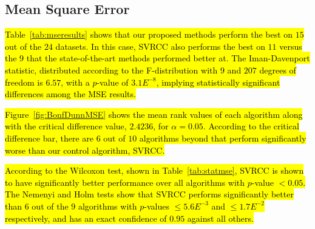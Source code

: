 \documentclass[preprint,12pt]{elsarticle}
\begin{document}
\subsection{Mean Square Error}\label{subsec:mse}
\hl{Table~{\ref{tab:mseresults}} shows that our proposed methods perform the best on $15$ out of the $24$ datasets. In this case, SVRCC also performs the best on $11$ versus the $9$ that the state-of-the-art methods performed better at. The Iman-Davenport statistic, distributed according to the F-distribution with $9$ and $207$ degrees of freedom is $6.57$, with a $p$-value of $3.1E^{-8}$, implying statistically significant differences among the MSE results.}

\hl{Figure~{\ref{fig:BonfDunnMSE}} shows the mean rank values of each algorithm along with the critical difference value, $2.4236$, for $\alpha = 0.05$. According to the critical difference bar, there are $6$ out of $10$ algorithms beyond that perform significantly worse than our control algorithm, SVRCC.}

\hl{According to the Wilcoxon test, shown in Table~{\ref{tab:statmse}}, SVRCC is shown to have significantly better performance over all algorithms with $p$-value $< 0.05$. The Nemenyi and Holm tests show that SVRCC performs significantly better than $6$ out of the $9$ algorithms with $p$-values $\leq 5.6E^{-3}$ and $\leq 1.7E^{-2}$ respectively, and has an exact confidence of $0.95$ against all others.}
\end{document}
